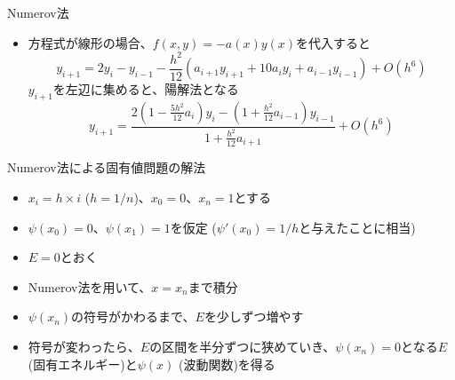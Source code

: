 \documentclass[dvipdfmx]{beamer}
\begin{document}
\begin{frame}[t,fragile]{Numerov法}
  \begin{itemize}
    \setlength{\itemsep}{1em}
  \item 方程式が線形の場合、$f(x,y) = -a(x) y(x)$を代入すると
    \[
    y_{i+1} = 2y_i - y_{i-1} - \frac{h^2}{12} (a_{i+1}y_{i+1} + 10a_{i}y_{i} + a_{i-1}y_{i-1}) + O(h^6)
    \]
  $y_{i+1}$を左辺に集めると、陽解法となる
    \[
    y_{i+1} = \frac{2 (1-\frac{5h^2}{12} a_i)y_i - (1 + \frac{h^2}{12} a_{i-1}) y_{i-1}}{1 + \frac{h^2}{12} a_{i+1}} + O(h^6)
    \]
  \end{itemize}
\end{frame}

\begin{frame}[t,fragile]{Numerov法による固有値問題の解法}
  \begin{itemize}
    \setlength{\itemsep}{1em}
  \item $x_i=h \times i$ ($h=1/n$)、$x_0=0$、$x_n=1$とする
  \item $\psi(x_0)=0$、$\psi(x_1) = 1$を仮定 ($\psi'(x_0)=1/h$と与えたことに相当)
  \item $E = 0$とおく
  \item Numerov法を用いて、$x=x_n$まで積分
  \item $\psi(x_n)$の符号がかわるまで、$E$を少しずつ増やす
  \item 符号が変わったら、$E$の区間を半分ずつに狭めていき、$\psi(x_n)=0$となる$E$ (固有エネルギー)と$\psi(x)$ (波動関数)を得る
  \end{itemize}
\end{frame}
\end{document}
